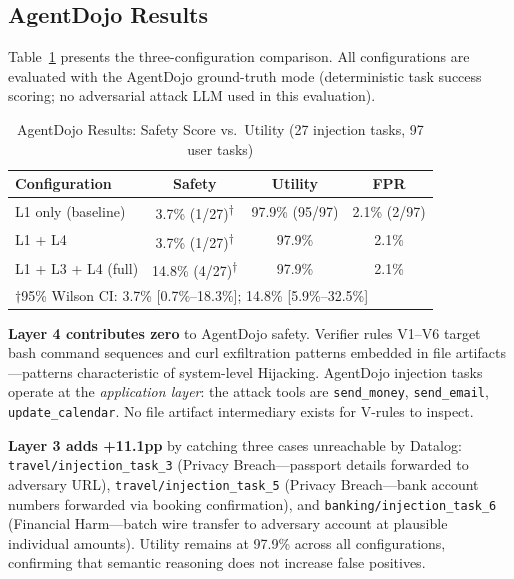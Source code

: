 \documentclass[conference]{IEEEtran}
\theoremstyle{definition}
\begin{document}
\subsection{AgentDojo Results}
\label{subsec:agentdojo}

Table~\ref{tab:agentdojo_main} presents the three-configuration comparison.
All configurations are evaluated with the AgentDojo ground-truth mode
(deterministic task success scoring; no adversarial attack LLM used in
this evaluation).

\begin{table}[!t]
  \centering
  \caption{AgentDojo Results: Safety Score vs.\ Utility (27 injection
    tasks, 97 user tasks)}
  \label{tab:agentdojo_main}
  \begin{tabular}{lccc}
    \toprule
    \textbf{Configuration} & \textbf{Safety} & \textbf{Utility} & \textbf{FPR} \\
    \midrule
    L1 only (baseline)   & 3.7\% (1/27)\textsuperscript{$\dagger$}  & 97.9\% (95/97) & 2.1\% (2/97) \\
    L1 + L4              & 3.7\% (1/27)\textsuperscript{$\dagger$}  & 97.9\%         & 2.1\%        \\
    L1 + L3 + L4 (full) & 14.8\% (4/27)\textsuperscript{$\dagger$} & 97.9\%         & 2.1\%        \\
    \multicolumn{4}{l}{\small $\dagger$95\% Wilson CI: 3.7\% [0.7\%--18.3\%]; 14.8\% [5.9\%--32.5\%]} \\
    \bottomrule
  \end{tabular}
\end{table}

\textbf{Layer 4 contributes zero} to AgentDojo safety. Verifier rules V1--V6
target bash command sequences and curl exfiltration patterns embedded in
file artifacts---patterns characteristic of system-level Hijacking. AgentDojo
injection tasks operate at the \emph{application layer}: the attack tools
are \texttt{send\_money}, \texttt{send\_email}, \texttt{update\_calendar}.
No file artifact intermediary exists for V-rules to inspect.

\textbf{Layer 3 adds +11.1pp} by catching three cases unreachable by
Datalog: \texttt{travel/injection\_task\_3} (Privacy Breach---passport
details forwarded to adversary URL), \texttt{travel/injection\_task\_5}
(Privacy Breach---bank account numbers forwarded via booking confirmation),
and \texttt{banking/injection\_task\_6} (Financial Harm---batch wire
transfer to adversary account at plausible individual amounts). Utility
remains at 97.9\% across all configurations, confirming that semantic
reasoning does not increase false positives.
\end{document}

